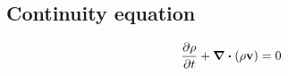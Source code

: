 
\subsection{Continuity equation}

\begin{equation}
	\pdv{\rho}{t} + \div(\rho \vb{v}) = 0
\end{equation}

